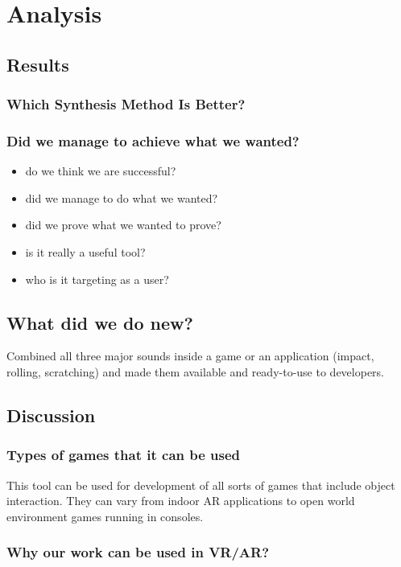 \chapter{Analysis}\label{ch:analysis}

\section{Results}

\subsection{Which Synthesis Method Is Better?}

\subsection{Did we manage to achieve what we wanted?}
\begin{itemize}
\item do we think we are successful?
\item did we manage to do what we wanted?
\item did we prove what we wanted to prove?
\item is it really a useful tool?
\item who is it targeting as a user?
\end{itemize} 

\section{What did we do new?}
Combined all three major sounds inside a game or an application (impact, rolling, scratching) and made them available and ready-to-use to developers.

\section{Discussion}

\subsection{Types of games that it can be used}
This tool can be used for development of all sorts of games that include object interaction. They can vary from indoor AR applications to open world environment games running in consoles. 

\subsection{Why our work can be used in VR/AR?}


